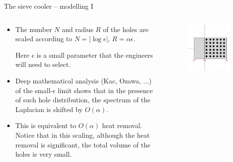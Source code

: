 \documentclass[10pt,mathserif]{beamer}
\begin{document}
\begin{frame}{The sieve cooler -- modelling I}

\begin{columns}[t]						%
\begin{column}{0.65\linewidth}
%
%
\begin{itemize}
\item The number $N$ and radius $R$ of the holes are scaled according to
$N = |\log \epsilon|$,  $R = \alpha\epsilon$.

Here $\epsilon$ is a small parameter that the engineers will need to select.
\item Deep mathematical analysis (Kac, Ozawa, ...) of the small-$\epsilon$ limit
shows that in the presence of such hole distribution, the spectrum
of the Laplacian is shifted by $O(\alpha)$.
\item This is equivalent to $O(\alpha)$ heat removal. Notice that in this scaling,
although the heat removal is significant, the total volume of the
holes is very small.
\end{itemize}
%
\end{column}
%
%
%
%
\begin{column}{0.4\linewidth}
\begin{figure}\begin{center}
\hspace{-0.2in}\includegraphics[width=0.9\linewidth]{figs_pdf/metal_plate}
\end{center}
\end{figure}
\end{column}
\end{columns}
\end{frame}
\end{document}
